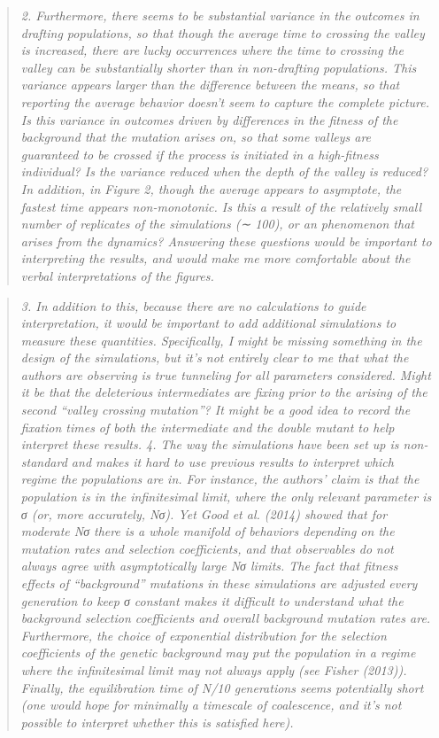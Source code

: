 \documentclass[11pt]{article}
\newenvironment{reviewerquote}{\begin{quote}\color{black}\itshape}{\end{quote}}
\begin{document}
\begin{reviewerquote}
2. Furthermore, there seems to be substantial variance in the outcomes in drafting populations, so that though the average time to crossing the valley is increased, there are lucky occurrences where the time to crossing the valley can be substantially shorter than in non-drafting populations. This variance appears larger than the difference between the means, so that reporting the average behavior doesn’t seem to capture the complete picture. Is this variance in outcomes driven by differences in the fitness of the background that the mutation arises on, so that some valleys are guaranteed to be crossed if the process is initiated in a high-fitness individual? Is the variance reduced when the depth of the valley is reduced? In addition, in Figure 2, though the average appears to asymptote, the fastest time appears non-monotonic. Is this a result of the relatively small number of replicates of the simulations (∼ 100), or an phenomenon that arises from the dynamics? Answering these questions would be important to interpreting the results, and would make me more comfortable about the verbal interpretations of the figures.
\end{reviewerquote}


\begin{reviewerquote}
3. In addition to this, because there are no calculations to guide interpretation, it would be important to add additional simulations to measure these quantities. Specifically, I might be missing something in the design of the simulations, but it’s not entirely clear to me that what the authors are observing is true tunneling for all parameters considered. Might it be that the deleterious intermediates are fixing prior to the arising of the second “valley crossing mutation”? It might be a good idea to record the fixation times of both the intermediate and the double mutant to help interpret these results.
4. The way the simulations have been set up is non-standard and makes it hard to use previous results to interpret which regime the populations are in. For instance, the authors’ claim is that the population is in the infinitesimal limit, where the only relevant parameter is σ (or, more accurately, Nσ). Yet Good et al. (2014) showed that for moderate Nσ there is a whole manifold of behaviors depending on the mutation rates and selection coefficients, and that observables do not always agree with asymptotically large Nσ limits. The fact that fitness effects of “background” mutations in these simulations are adjusted every generation to keep σ constant makes it difficult to understand what the background selection coefficients and overall background mutation rates are. Furthermore, the choice of exponential distribution for the selection coefficients of the genetic background may put the population in a regime where the infinitesimal limit may not always apply (see Fisher (2013)). Finally, the equilibration time of N/10 generations seems potentially short (one would hope for minimally a timescale of coalescence, and it’s not possible to interpret whether this is satisfied here).
\end{reviewerquote}
\end{document}

